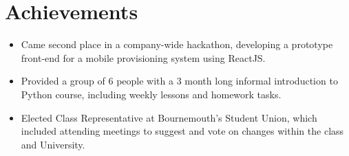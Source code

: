 \section{Achievements}

\begin{itemize}
	\setlength\itemsep{0em}
	\item Came second place in a company-wide hackathon, developing a prototype front-end for a mobile provisioning system using ReactJS. 
	\item Provided a group of 6 people with a 3 month long informal introduction to Python course, including weekly lessons and homework tasks. 
	\item Elected Class Representative at Bournemouth's Student Union, which included attending meetings to suggest and vote on changes within the class and University.
\end{itemize}